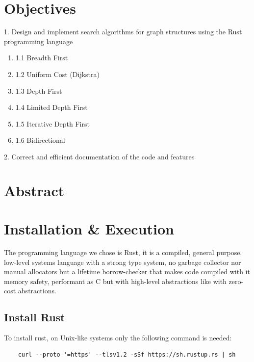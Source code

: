 \vfill

\newpage
{}
\tableofcontents

\newpage
\section{Objectives}

1. Design and implement search algorithms for graph structures using
the Rust programming language

\begin{enumerate}[label={}]
    \item 1.1 Breadth First
    \item 1.2 Uniform Cost (Dijkstra)
    \item 1.3 Depth First
    \item 1.4 Limited Depth First
    \item 1.5 Iterative Depth First
    \item 1.6 Bidirectional
\end{enumerate}



2. Correct and efficient documentation of the code and features


\section{Abstract}


\newpage
\section{Installation \& Execution}

The programming language we chose is Rust, it is a compiled,
general purpose, low-level systems language with a strong type system,
no garbage collector nor manual allocators but a lifetime borrow-checker that
makes code compiled with it memory safety, performant as C but with high-level
abstractions like with zero-cost abstractions.

\subsection{Install Rust}

To install rust, on Unix-like systems only the following command is needed:

\begin{verbatim}
    curl --proto '=https' --tlsv1.2 -sSf https://sh.rustup.rs | sh
\end{verbatim}

